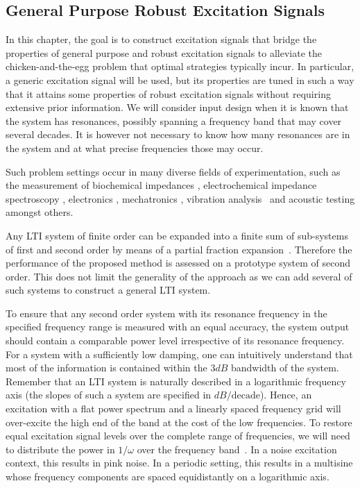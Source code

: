 \subsection{General Purpose Robust Excitation Signals}
\label{sec:excitation:intro:approach}
In this chapter, the goal is to construct excitation signals that bridge the properties of general purpose and robust excitation signals to alleviate the chicken-and-the-egg problem that optimal strategies typically incur.
In particular, a generic excitation signal will be used, but its properties are tuned in such a way that it attains some properties of robust excitation signals without requiring extensive prior information.
We will consider input design when it is known that the system has resonances, possibly spanning a frequency band that may cover several decades. 
It is however not necessary to know how many resonances are in the system and at what precise frequencies those may occur.

Such problem settings occur in many diverse fields of experimentation, such as the measurement of biochemical impedances \citep{Bragos2001,Sanchez2011}, electrochemical impedance spectroscopy \citep{Niedostatkiewicz2009,VanGheem2004,Breugelmans2010}, electronics \citep{Munir2011}, mechatronics \citep{Steinbuch1998,Oomen2016}, vibration analysis~\citep{Karnopp1995,Voorhoeve2015SYSID} and acoustic testing \citep{GarciaLopez2014,DAmico2014} amongst others. 

  Any \gls{LTI} system of finite order can be expanded into a finite sum of sub-systems of first and second order by means of a partial fraction expansion~\citep{Oppenheim1983}.
  Therefore the performance of the proposed method is assessed on a prototype system of second order.
  This does not limit the generality of the approach as we can add several of such systems to construct a general \gls{LTI} system.
  
  To ensure that any second order system with its resonance frequency in the specified frequency range is measured with an equal accuracy, the system output should contain a comparable power level irrespective of its resonance frequency.
  For a system with a sufficiently low damping, one can intuitively understand that most of the information is contained within the $3 \unit{dB}$ bandwidth of the system.
  Remember that an \gls{LTI} system is naturally described in a logarithmic frequency axis (the slopes of such a system are specified in $\unit{dB}/\text{decade}$).
  Hence, an excitation with a flat power spectrum and a linearly spaced frequency grid will over-excite the high end of the band at the cost of the low frequencies.
  To restore equal excitation signal levels over the complete range of frequencies, we will need to distribute the power in $1/\omega$ over the frequency band~\citep{Goodwin2006,Goodwin2006GBO}.
  In a noise excitation context, this results in pink noise.
  In a periodic setting, this results in a multisine whose frequency components are spaced equidistantly on a logarithmic axis.
  
